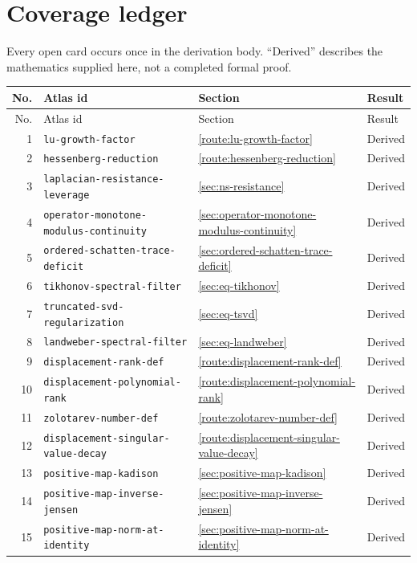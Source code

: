 \documentclass[11pt,a4paper]{article}
\DeclareRobustCommand{\code}[1]{{\footnotesize\urlstyle{tt}\nolinkurl{#1}}}
\begin{document}
\tableofcontents
\clearpage
\section*{Coverage ledger}
Every open card occurs once in the derivation body. ``Derived'' describes
the mathematics supplied here, not a completed formal proof.
\small
\begin{longtable}{@{}r p{} l l@{}}
\toprule
No. & Atlas id & Section & Result \\
\midrule
\endfirsthead
\toprule
No. & Atlas id & Section & Result \\
\midrule
\endhead
1 & \code{lu-growth-factor} & \ref{route:lu-growth-factor} & Derived \\
2 & \code{hessenberg-reduction} & \ref{route:hessenberg-reduction} & Derived \\
3 & \code{laplacian-resistance-leverage} & \ref{sec:ns-resistance} & Derived \\
4 & \code{operator-monotone-modulus-continuity} & \ref{sec:operator-monotone-modulus-continuity} & Derived \\
5 & \code{ordered-schatten-trace-deficit} & \ref{sec:ordered-schatten-trace-deficit} & Derived \\
6 & \code{tikhonov-spectral-filter} & \ref{sec:eq-tikhonov} & Derived \\
7 & \code{truncated-svd-regularization} & \ref{sec:eq-tsvd} & Derived \\
8 & \code{landweber-spectral-filter} & \ref{sec:eq-landweber} & Derived \\
9 & \code{displacement-rank-def} & \ref{route:displacement-rank-def} & Derived \\
10 & \code{displacement-polynomial-rank} & \ref{route:displacement-polynomial-rank} & Derived \\
11 & \code{zolotarev-number-def} & \ref{route:zolotarev-number-def} & Derived \\
12 & \code{displacement-singular-value-decay} & \ref{route:displacement-singular-value-decay} & Derived \\
13 & \code{positive-map-kadison} & \ref{sec:positive-map-kadison} & Derived \\
14 & \code{positive-map-inverse-jensen} & \ref{sec:positive-map-inverse-jensen} & Derived \\
15 & \code{positive-map-norm-at-identity} & \ref{sec:positive-map-norm-at-identity} & Derived \\

\end{longtable}
\end{document}
